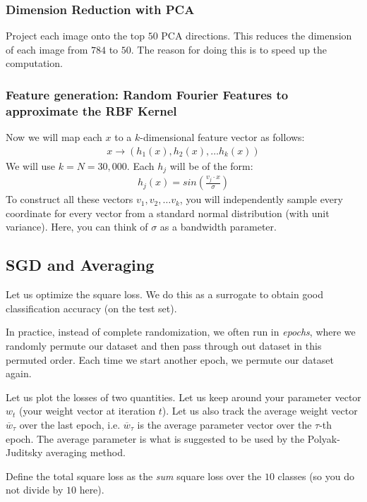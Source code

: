 \documentclass{article}
\begin{document}
\subsubsection*{Dimension Reduction with PCA}

Project each image onto the top $50$ PCA directions. This reduces the dimension of each image from $784$ to $50$. The reason for doing this is to speed up the computation.

\subsubsection*{Feature generation: Random Fourier Features to approximate the RBF Kernel}
Now we will map each $x$ to a $k$-dimensional feature vector as follows:
\begin{align}
	x \rightarrow (h_1(x), h_2(x), \ldots h_k(x))
\end{align}
We will use $k=N=30,000$.  Each $h_j$ will be of the form:
\begin{align}
	h_j(x) = sin\left(\frac{v_j \cdot x}{\sigma}\right)
\end{align}
To construct all these vectors $v_1, v_2,\ldots v_k$, you will independently sample every coordinate for every vector from a standard normal distribution (with unit variance). Here, you can think of $\sigma$ as a bandwidth parameter.

\subsection{SGD and Averaging}
Let us optimize the square loss. We do this as a surrogate to obtain good classification accuracy (on the test set).

In practice, instead of complete randomization, we often run in \emph{epochs}, where we randomly permute our dataset and then pass through out dataset in this permuted order. Each time we start another epoch, we permute our dataset again.

Let us plot the losses of two quantities. Let us keep around your parameter vector $w_t$ (your weight vector at iteration $t$). Let us also track the average weight vector $\overline{w}_\tau$ over the last epoch, i.e. $\overline{w}_\tau$ is the average parameter vector over the $\tau$-th epoch.  The average parameter is what is suggested to be used by the Polyak-Juditsky averaging method.

Define the total square loss as the \emph{sum} square loss over the $10$ classes (so you do not divide by $10$ here).
\end{document}
